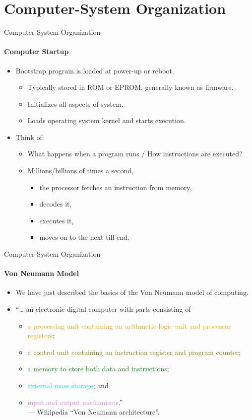 \documentclass[10pt]{beamer}
\begin{document}
\section[2.Organization]{Computer-System Organization}
\begin{frame}{Computer-System Organization}
\framesubtitle{Computer Startup}
\begin{itemize}
\item \alert{Bootstrap program} is loaded at power-up or reboot.
\begin{itemize}
\item Typically stored in ROM or EPROM, generally known as firmware.
\item Initializes all aspects of system.
\item Loads operating system kernel and starts execution.
\end{itemize}
\item Think of:
\begin{itemize}
\item What happens when a program runs / How instructions are executed?
\item Millions/billions of times a second,
\begin{itemize}
\item the processor fetches an instruction from memory,
\item decodes it,
\item executes it,
\item moves on to the next till end.
\end{itemize}
\end{itemize}
\end{itemize}
\end{frame}

\begin{frame}{Computer-System Organization}
\framesubtitle{Von Neumann Model}
\begin{itemize}
\item We have just described the basics of the \alert{Von Neumann model} of computing.
\item ``… an electronic digital computer with parts consisting of 
\begin{itemize}
\item \textcolor{orange}{a processing unit containing an arithmetic logic unit and processor registers}; 
\item \textcolor{olive}{a control unit containing an instruction register and program counter}; 
\item \textcolor{green}{a memory to store both data and instructions}; 
\item \textcolor{cyan}{external mass storage}; and
\item \textcolor{violet}{input and output mechanisms}.''\\
{--- Wikipedia ``Von Neumann architecture''.}
\end{itemize}
\end{itemize}
\end{frame}
\end{document}
